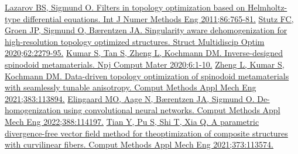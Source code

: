 \documentclass[a4paper,7pt,fleqn]{article}   %
\begin{document}
\begin{multicols}{2}
\begin{thebibliography}{99}
			\href{https://doi.org/10.1002/nme.3072}{Lazarov BS, Sigmund O. Filters in topology optimization based on Helmholtz-type differential equations. Int J Numer Methods Eng 2011;86:765-81.}
			\href{https://doi.org/10.1007/s00158-020-02681-6}{Stutz FC, Groen JP, Sigmund O, Bærentzen JA. Singularity aware dehomogenization for high-resolution topology optimized structures. Struct Multidiscip Optim 2020;62:2279-95.}
			\href{https://doi.org/10.1038/s41524-020-0341-6}{Kumar S, Tan S, Zheng L, Kochmann DM. Inverse-designed spinodoid metamaterials. Npj Comput Mater 2020;6:1-10.}
			\href{https://doi.org/10.1016/j.cma.2021.113894}{Zheng L, Kumar S, Kochmann DM. Data-driven topology optimization of spinodoid metamaterials with seamlessly tunable anisotropy. Comput Methods Appl Mech Eng 2021;383:113894.}
			\href{https://doi.org/10.1016/j.cma.2021.114197}{Elingaard MO, Aage N, Bærentzen JA, Sigmund O. De-homogenization using convolutional neural networks. Comput Methods Appl Mech Eng 2022;388:114197.}
			\href{https://doi.org/10.1016/j.cma.2020.113574}{Tian Y, Pu S, Shi T, Xia Q. A parametric divergence-free vector field method for theoptimization of composite structures with curvilinear fibers. Comput Methods Appl Mech Eng 2021;373:113574.}
			
		\end{thebibliography}
		
	\end{multicols}
	
\end{document}
